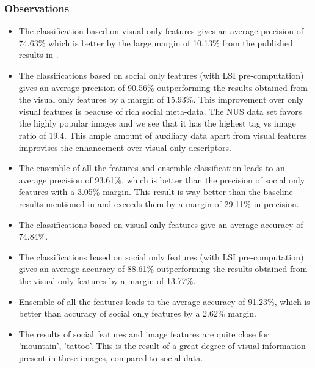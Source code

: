 \subsubsection*{Observations}
\begin{itemize}
\item The classification based on visual only features gives an  average precision of 74.63\% which is better by the large margin
of 10.13\% from the published results in \citet*{NUS}.
\item The classifications based on social only features (with LSI pre-computation) gives an average precision of 90.56\% outperforming
the results obtained from the visual only features by a  margin of 15.93\%. This improvement over only visual features is beacuse of rich social meta-data. The NUS data set favors the highly popular images and we see that it has the highest tag vs image ratio of 19.4. This ample amount of auxiliary data apart from visual features improvises the enhancement over visual only descriptors.
\item The ensemble of all the features and ensemble classification leads to an average precision of 93.61\%, which  is better than the precision of social only features with a 3.05\% margin. This result is way better than the baseline results mentioned in \citet*{NUS} and exceeds them by a margin of 29.11\% in precision.
\item The classifications based on visual only features give an average accuracy of 74.84\%.
\item The classifications based on social only features (with LSI pre-computation) gives an average accuracy of 88.61\% outperforming
the results obtained from the visual only features by a margin of 13.77\%.
\item Ensemble of all the features leads to the average accuracy of 91.23\%, which is better than accuracy of social only features by a 2.62\% margin.
\item The results of social features and image features are quite close for 'mountain', 'tattoo'. This is the result of a great degree
of visual information present in these images, compared to social data.
\end{itemize}

